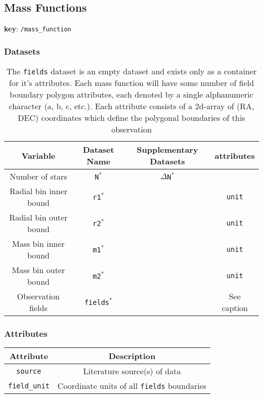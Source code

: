 \subsection{Mass Functions}

\textbf{key}: \texttt{/mass\_function}

\subsubsection{Datasets}

\begin{center}
\begin{table}[H]
\begin{tabular}{ | c | c | c | c | }
    \hline
    Variable & Dataset Name & Supplementary Datasets &  attributes \\
    \hline\hline
    Number of stars & \texttt{N\(^*\)} & \texttt{\(\Delta\)N\(^*\)} & \\
    \hline
    Radial bin inner bound & \texttt{r1\(^*\)} & & \texttt{unit} \\
    \hline
    Radial bin outer bound & \texttt{r2\(^*\)} & & \texttt{unit} \\
    \hline
    Mass bin inner bound & \texttt{m1\(^*\)} & & \texttt{unit} \\
    \hline
    Mass bin outer bound & \texttt{m2\(^*\)} & & \texttt{unit} \\
    \hline
    Observation fields & \texttt{fields\(^*\)} & & See caption \\
    \hline
\end{tabular}
\caption*{
    The \texttt{fields} dataset is an empty dataset and exists only as a
    container for it's attributes. Each mass function will have some number of
    field boundary polygon attributes, each denoted by a single alphanumeric
    character (a, b, c, etc.). Each attribute consists of a 2d-array of
    (RA, DEC) coordinates which define the polygonal boundaries of this
    observation
}
\end{table}
\end{center}



\subsubsection{Attributes}

\begin{center}
\begin{table}[H]
\begin{tabular}{ | c | c | }
    \hline
    Attribute & Description \\
    \hline\hline
    \texttt{source} & Literature source(s) of data \\
    \hline
    \texttt{field\_unit} & Coordinate units of all \texttt{fields} boundaries \\
    \hline
\end{tabular}
\end{table}
\end{center}

